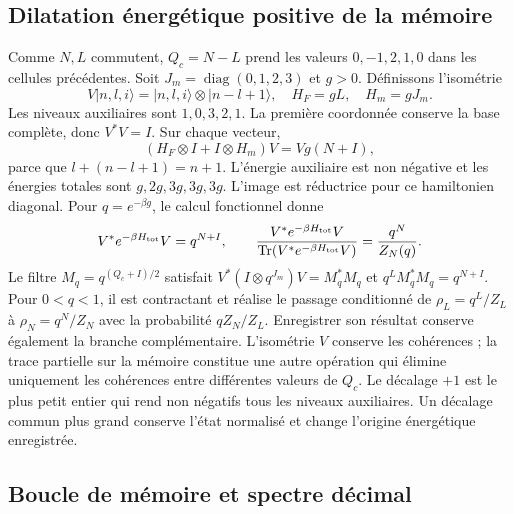 \subsection{Dilatation énergétique positive de la mémoire}
\label{sec:ii-ter27-memoria}

Comme $N,L$ commutent, $Q_c=N-L$ prend les valeurs $0,-1,2,1,0$ dans les
cellules précédentes. Soit $J_m=\operatorname{diag}(0,1,2,3)$ et $g>0$.
Définissons l’isométrie
\begin{equation}
 V|n,l,i\rangle=|n,l,i\rangle\otimes|n-l+1\rangle,
 \quad H_F=gL,\quad H_m=gJ_m.
 \label{eq:ii-ter27-lift}
\end{equation}
Les niveaux auxiliaires sont $1,0,3,2,1$. La première coordonnée conserve
la base complète, donc $V^*V=I$. Sur chaque vecteur,
\begin{equation}
 (H_F\otimes I+I\otimes H_m)V=Vg(N+I),
 \label{eq:ii-ter27-energia-memoria}
\end{equation}
parce que $l+(n-l+1)=n+1$. L’énergie auxiliaire est non négative et les
énergies totales sont $g,2g,3g,3g,3g$. L’image est réductrice pour ce
hamiltonien diagonal. Pour $q=e^{-\beta g}$, le calcul fonctionnel donne
\[
 V^*e^{-\beta H_{\rm tot}}V=q^{N+I},\qquad
 \frac{V^*e^{-\beta H_{\rm tot}}V}
 {\operatorname{Tr}(V^*e^{-\beta H_{\rm tot}}V)}=\frac{q^N}{Z_N(q)}.
\]
Le filtre $M_q=q^{(Q_c+I)/2}$ satisfait
$V^*(I\otimes q^{J_m})V=M_q^*M_q$ et
$q^L M_q^*M_q=q^{N+I}$. Pour $0<q<1$, il est contractant et réalise le
passage conditionné de $\rho_L=q^L/Z_L$ à $\rho_N=q^N/Z_N$ avec la
probabilité $qZ_N/Z_L$. Enregistrer son résultat conserve également la
branche complémentaire. L’isométrie $V$ conserve les cohérences ; la trace
partielle sur la mémoire constitue une autre opération qui élimine uniquement les
cohérences entre différentes valeurs de $Q_c$.
Le décalage $+1$ est le plus petit entier qui rend non négatifs tous
les niveaux auxiliaires. Un décalage commun plus grand conserve l’état
normalisé et change l’origine énergétique enregistrée.

\subsection{Boucle de mémoire et spectre décimal}
\label{sec:ii-ter27-espectro}

